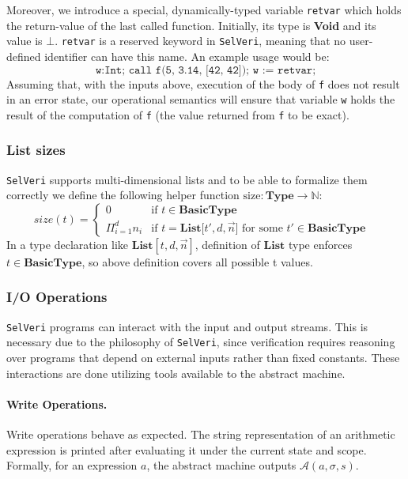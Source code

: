 \documentclass{article}
\begin{document}
Moreover, we introduce a special, dynamically-typed variable \texttt{retvar} which holds the return-value of the last called function. Initially, its type is \textbf{Void} and its value is $\bot$. \texttt{retvar} is a reserved keyword in \texttt{SelVeri}, meaning that no user-defined identifier can have this name.  An example usage would be: 
\[
\texttt{w:Int; call f(5, 3.14, [42, 42]); w := retvar;}
\]
Assuming that, with the inputs above, execution of the body of \texttt{f} does not result in an error state, our operational semantics will ensure that variable \texttt{w} holds the result of the computation of \texttt{f} (the value returned from \texttt{f} to be exact).

\subsubsection{List sizes}

\texttt{SelVeri} supports multi-dimensional lists and to be able to formalize them correctly we define the following helper function $\text{size}: \textbf{Type} \to \mathbb{N}$:
\[
size(t) = \begin{cases}
    0 & \text{if $t \in \textbf{BasicType}$ } \\
    \Pi_{i = 1}^d{n_i} & \text{if $t = \textbf{List[$t', d, \vec{n}$]}$ for some $t' \in \textbf{BasicType}$ } 
\end{cases}
\]
In a type declaration like $\textbf{List}[t, d, \vec{n}]$, definition of $\textbf{List}$ type enforces $t \in \textbf{BasicType}$, so above definition covers all possible t values.

\subsubsection{I/O Operations}
\texttt{SelVeri} programs can interact with the input and output streams. This is necessary due to the philosophy of \texttt{SelVeri}, since verification requires reasoning over programs that depend on external inputs rather than fixed constants. These interactions are done utilizing tools available to the abstract machine\footnotemark.

\paragraph{Write Operations.}
Write operations behave as expected. The string representation of an arithmetic expression is printed after evaluating it under the current state and scope. Formally, for an expression $a$, the abstract machine outputs $\mathcal{A}(a, \sigma, s)$.
\end{document}

